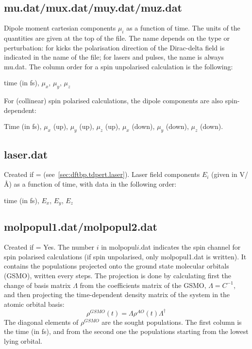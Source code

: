 \subsection{mu.dat/mux.dat/muy.dat/muz.dat}

Dipole moment cartesian components $\mu_i$ as a function of time. The
units of the quantities are given at the top of the file. The name
depends on the type or perturbation: for kicks the polarisation
direction of the Dirac-delta field is indicated in the name of the
file; for lasers and pulses, the name is always mu.dat. The column
order for a spin unpolarised calculation is the following:

time (in fs), $\mu_x$, $\mu_y$, $\mu_z$

For (collinear) spin polarised calculations, the dipole components are
also spin-dependent:

Time (in fs), $\mu_x$ (up), $\mu_y$ (up), $\mu_z$ (up), $\mu_x$
(down), $\mu_y$ (down), $\mu_z$ (down).

\subsection{laser.dat}

Created if  = 
(see~\ref{sec:dftbp.tdpert.laser}). Laser field components $E_i$ (given in
V/\AA) as a function of time, with data in the following order:

time (in fs), $E_x$, $E_y$, $E_z$

\subsection{molpopul1.dat/molpopul2.dat}

Created if  = Yes. The number $i$ in molpopul$i$.dat
indicates the spin channel for spin polarised calculations (if spin
unpolarised, only molpopul1.dat is written). It contains the
populations projected onto the ground state molecular orbitals (GSMO),
written every  steps. The projection is done by
calculating first the change of basis matrix $\Lambda$ from the
coefficients matrix of the GSMO, $\Lambda = C^{-1}$, and then
projecting the time-dependent density matrix of the system in the
atomic orbital basis:
\begin{equation*}
  \rho^{GSMO}(t) = \Lambda \rho^{AO}(t) \Lambda^{\dagger}
\end{equation*}
The diagonal elements of $\rho^{GSMO}$ are the sought populations. The first
column is the time (in fs), and from the second one the populations starting
from the lowest lying orbital.

